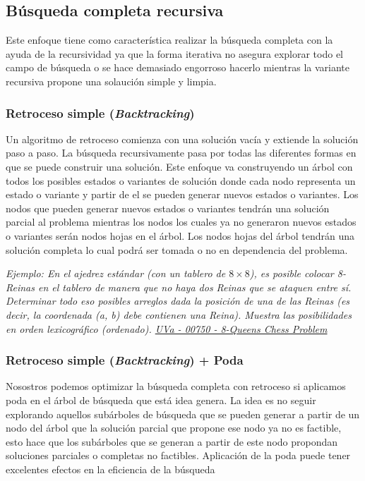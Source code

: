 \subsection{Búsqueda completa recursiva}

Este enfoque tiene como característica realizar la búsqueda completa con la ayuda de la recursividad ya que la forma iterativa no asegura explorar todo el campo de búsqueda o se hace demasiado engorroso hacerlo mientras la variante recursiva propone una solaución simple y limpia.

\subsubsection{Retroceso simple (\emph{Backtracking})}
Un algoritmo de retroceso comienza con una solución vacía y extiende la solución paso a paso. La búsqueda recursivamente pasa por todas las diferentes formas en que se puede construir una solución. Este enfoque va construyendo un árbol con todos los posibles estados o variantes de solución donde cada nodo representa un estado o variante y partir de el se pueden generar nuevos estados o variantes. Los nodos que pueden generar nuevos estados o variantes tendrán una solución parcial al problema mientras los nodos los cuales ya no generaron nuevos estados o variantes serán nodos hojas en el árbol. Los nodos hojas del árbol tendrán una solución completa lo cual podrá ser tomada o no en dependencia del problema. 

\emph{Ejemplo: En el ajedrez estándar (con un tablero de $8 \times 8$), es posible colocar 8-Reinas en el tablero de manera que no haya dos Reinas que se ataquen entre sí. Determinar todo eso posibles arreglos dada la posición de una de las Reinas (es decir, la coordenada (a, b) debe contienen una Reina). Muestra las posibilidades en orden lexicográfico (ordenado). \href{https://onlinejudge.org/index.php?option=onlinejudge&Itemid=8&page=show_problem&problem=691}{UVa - 00750 - 8-Queens Chess Problem}}

\subsubsection{Retroceso simple (\emph{Backtracking}) + Poda}
Nosostros podemos optimizar la búsqueda completa con retroceso si aplicamos poda en el árbol de búsqueda que está idea genera. La idea es no seguir explorando aquellos subárboles de búsqueda que se pueden generar a partir de un nodo del árbol que la solución parcial que propone ese nodo ya no es factible, esto hace que los subárboles que se generan a partir de este nodo propondan soluciones parciales o completas no factibles. Aplicación de la poda puede tener excelentes efectos en la eficiencia de la búsqueda  


